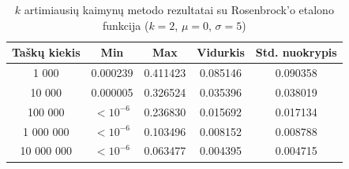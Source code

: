 \begin{table}[H]
    \centering
    \begin{tabular}{|c|c|c|c|c|}
        \hline
        \textbf{Taškų kiekis} & \textbf{Min} & \textbf{Max} & \textbf{Vidurkis} & \textbf{Std. nuokrypis} \\ \hline
        1 000        & 0.000239 & 0.411423 & 0.085146 & 0.090358 \\ \hline
        10 000       & 0.000005 & 0.326524 & 0.035396 & 0.038019 \\ \hline
        100 000      & $<10^{-6}$ & 0.236830 & 0.015692 & 0.017134 \\ \hline
        1 000 000    & $<10^{-6}$ & 0.103496 & 0.008152 & 0.008788 \\ \hline
        10 000 000   & $<10^{-6}$ & 0.063477 & 0.004395 & 0.004715 \\ \hline
    \end{tabular}
    \caption{$k$ artimiausių kaimynų metodo rezultatai su Rosenbrock'o etalono funkcija ($k = 2$, $\mu = 0$, $\sigma = 5$)}
\end{table}